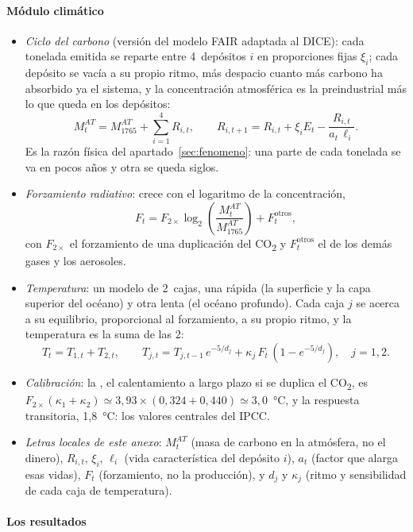 \documentclass[11pt]{article}
\begin{document}
\paragraph{Módulo climático}

\begin{itemize}
\item \emph{Ciclo del carbono} (versión del modelo FAIR adaptada al DICE): cada tonelada emitida se reparte entre 4~depósitos $i$ en proporciones fijas $\xi_i$; cada depósito se vacía a su propio ritmo, más despacio cuanto más carbono ha absorbido ya el sistema, y la concentración atmosférica es la preindustrial más lo que queda en los depósitos:
  \[
  M^{AT}_t=M^{AT}_{1765}+\sum_{i=1}^{4}R_{i,t},\qquad R_{i,t+1}=R_{i,t}+\xi_iE_t-\frac{R_{i,t}}{a_t\,\ell_i}.
  \]
  Es la razón física del apartado~\ref{sec:fenomeno}: una parte de cada tonelada se va en pocos años y otra se queda siglos.
\item \emph{Forzamiento radiativo}: crece con el logaritmo de la concentración,
  \[
  F_t=F_{2\times}\log_2\!\left(\frac{M^{AT}_t}{M^{AT}_{1765}}\right)+F^{\mathrm{otros}}_t,
  \]
  con $F_{2\times}$ el forzamiento de una duplicación del CO\textsubscript{2} y $F^{\mathrm{otros}}_t$ el de los demás gases y los aerosoles.
\item \emph{Temperatura}: un modelo de 2~cajas, una rápida (la superficie y la capa superior del océano) y otra lenta (el océano profundo). Cada caja $j$ se acerca a su equilibrio, proporcional al forzamiento, a su propio ritmo, y la temperatura es la suma de las 2:
  \[
  T_t=T_{1,t}+T_{2,t},\qquad T_{j,t}=T_{j,t-1}\,e^{-5/d_j}+\kappa_j\,F_t\,\left(1-e^{-5/d_j}\right),\quad j=1,2.
  \]
\item \emph{Calibración}: la , el calentamiento a largo plazo si se duplica el CO\textsubscript{2}, es $F_{2\times}(\kappa_1+\kappa_2)\simeq3{,}93\times(0{,}324+0{,}440)\simeq3{,}0$~°C, y la respuesta transitoria, 1,8~°C: los valores centrales del IPCC\nocite{IPCC2021SPM,BarrageNordhaus2024DICE}.
\item \emph{Letras locales de este anexo}: $M^{AT}_t$ (masa de carbono en la atmósfera, no el dinero), $R_{i,t}$, $\xi_i$, $\ell_i$ (vida característica del depósito $i$), $a_t$ (factor que alarga esas vidas), $F_t$ (forzamiento, no la producción), y $d_j$ y $\kappa_j$ (ritmo y sensibilidad de cada caja de temperatura).
\end{itemize}

\paragraph{Los resultados}
\end{document}
